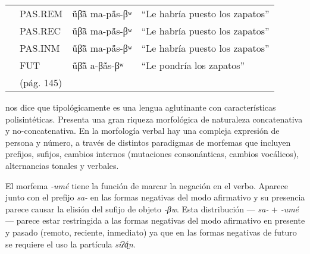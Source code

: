 {\begin{tabular}{llll}
             & PAS.REM    & ṹβ̃ã ma-pã́s-βʷ          & “Le habría puesto los zapatos” \\
             & PAS.REC    & ṹβ̃ã ma-pã́s-βʷ          & “Le habría puesto los zapatos” \\
             & PAS.INM    & ṹβ̃ã ma-pã́s-βʷ          & “Le habría puesto los zapatos” \\
             & FUT        & ṹβ̃ã a-βã́s-βʷ           & “Le pondría los zapatos”       \\
             & (pág. 145) &                        &                                \\
    \end{tabular}
} \vspace{0.25cm}

\textcolor{MidnightBlue}{\citet{chichimeco}} nos dice que tipológicamente es una lengua aglutinante con características polisintéticas. Presenta una gran riqueza morfológica de naturaleza concatenativa y no-concatenativa. En la morfología verbal hay una compleja expresión de persona y número, a través de distintos paradigmas de morfemas que incluyen prefijos, sufijos, cambios internos (mutaciones consonánticas, cambios vocálicos), alternancias tonales y verbales.

El morfema {\setmainfont{Charis SIL} \textit{-umé}} tiene la función de marcar la negación en el verbo. Aparece junto con el prefijo {\setmainfont{Charis SIL} \textit{sa-}} en las formas negativas del modo afirmativo y su presencia parece causar la elisión del sufijo de objeto {\setmainfont{Charis SIL}\textit{-βw}}. Esta distribución —{\setmainfont{Charis SIL} \textit{sa-}} + {\setmainfont{Charis SIL} \textit{-umé}}— parece estar restringida a las formas negativas del modo afirmativo en presente y pasado (remoto, reciente, inmediato) ya que en las formas negativas de futuro se requiere el uso la partícula {\setmainfont{Charis SIL}\textit{siʔá̤n}.}
